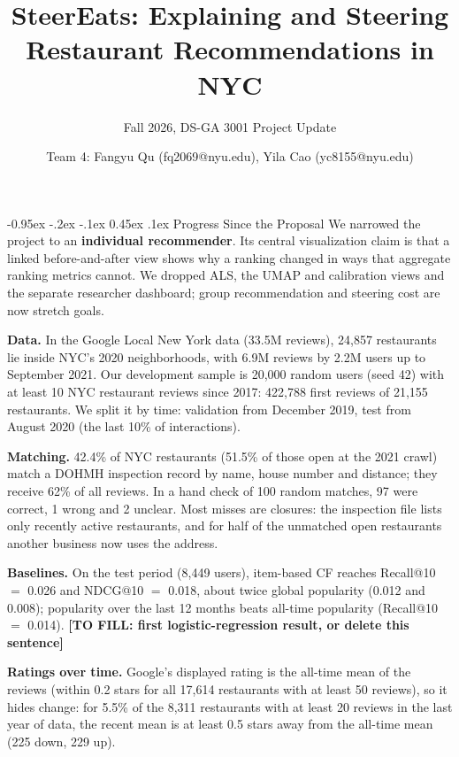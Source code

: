 \documentclass[10pt]{article}
\title{SteerEats: Explaining and Steering Restaurant Recommendations in NYC\vspace{-.5em}}
\author{Fall 2026, DS-GA 3001 Project Update\vspace{-.5em}}
\date{Team 4: Fangyu Qu (fq2069@nyu.edu), Yila Cao (yc8155@nyu.edu)}
\makeatletter
\newcommand{\placeholder}[1]{\textbf{[TO FILL: #1]}}
\renewcommand\section{\@startsection{section}{1}{\z@}%
  {-0.95ex \@plus -.2ex \@minus -.1ex}%
  {0.45ex \@plus .1ex}%
  {\normalfont\large\bfseries}}
\makeatother
\begin{document}
\maketitle
\thispagestyle{empty}
\vspace{-2.5em}

\section{Progress Since the Proposal}
We narrowed the project to an \textbf{individual recommender}. Its central visualization claim is that a linked
before-and-after view shows why a ranking changed in ways that aggregate ranking metrics cannot. We dropped ALS,
the UMAP and calibration views and the separate researcher dashboard; group recommendation and steering cost
are now stretch goals.

\textbf{Data.} In the Google Local New York data (33.5M reviews), 24,857 restaurants lie inside NYC's 2020
neighborhoods, with 6.9M reviews by 2.2M users up to September 2021. Our
development sample is 20,000 random users (seed 42) with at least 10 NYC restaurant reviews since 2017: 422,788
first reviews of 21,155 restaurants. We split it by time: validation from December 2019, test from August 2020
(the last 10\% of interactions).

\textbf{Matching.} 42.4\% of NYC restaurants (51.5\% of those open at the 2021 crawl) match a DOHMH inspection record
by name, house number and distance; they receive 62\% of all reviews. In a hand check of 100 random matches, 97 were
correct, 1 wrong and 2 unclear. Most misses are closures: the inspection file lists only recently active restaurants, and
for half of the unmatched open restaurants another business now uses the address.

\textbf{Baselines.} On the test period (8,449 users), item-based CF reaches Recall@10 $=$ 0.026 and NDCG@10 $=$ 0.018,
about twice global popularity (0.012 and 0.008); popularity over the last 12 months beats all-time popularity
(Recall@10 $=$ 0.014). \placeholder{first logistic-regression result, or delete this sentence}

\textbf{Ratings over time.} Google's displayed rating is the all-time mean of the reviews (within 0.2 stars for all
17,614 restaurants with at least 50 reviews), so it hides change: for 5.5\% of the 8,311 restaurants with at least 20
reviews in the last year of data, the recent mean is at least 0.5 stars away from the all-time mean (225 down, 229 up).
\end{document}
